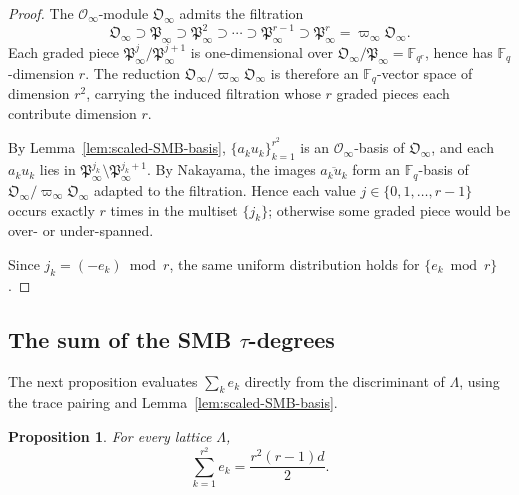 \documentclass[12pt]{amsart}
\newtheorem{prop}[thm]{Proposition}
\theoremstyle{definition}
\theoremstyle{remark}
\numberwithin{equation}{section}
\numberwithin{thm}{section}
\newcommand{\fO}{\mathfrak{O}}
\newcommand{\fP}{\mathfrak{P}}
\newcommand{\cO}{\mathcal{O}}
\newcommand{\F}{\mathbb{F}}
\newcommand{\La}{\Lambda}
\begin{document}
	\begin{proof}
		The $\cO_\infty$-module $\fO_\infty$ admits the filtration
		\[
		\fO_\infty \supset \fP_\infty \supset \fP_\infty^2 \supset \cdots \supset \fP_\infty^{r-1} \supset \fP_\infty^r = \varpi_\infty \fO_\infty.
		\]
		Each graded piece $\fP_\infty^j/\fP_\infty^{j+1}$ is one-dimensional over $\fO_\infty/\fP_\infty = \F_{q^r}$, hence has $\F_q$-dimension $r$. The reduction $\fO_\infty/\varpi_\infty \fO_\infty$ is therefore an $\F_q$-vector space of dimension $r^2$, carrying the induced filtration whose $r$ graded pieces each contribute dimension $r$.
		
		By Lemma~\ref{lem:scaled-SMB-basis}, $\{a_k u_k\}_{k=1}^{r^2}$ is an $\cO_\infty$-basis of $\fO_\infty$, and each $a_k u_k$ lies in $\fP_\infty^{j_k} \setminus \fP_\infty^{j_k+1}$. By Nakayama, the images $\overline{a_k u_k}$ form an $\F_q$-basis of $\fO_\infty/\varpi_\infty \fO_\infty$ adapted to the filtration. Hence each value $j \in \{0, 1, \ldots, r-1\}$ occurs exactly $r$ times in the multiset $\{j_k\}$; otherwise some graded piece would be over- or under-spanned.
		
		Since $j_k = (-e_k) \bmod r$, the same uniform distribution holds for $\{e_k \bmod r\}$.
	\end{proof}
	
	\subsection{The sum of the SMB \texorpdfstring{$\tau$}{tau}-degrees}\label{sub:sum-ek}
	
	The next proposition evaluates $\sum_k e_k$ directly from the discriminant of $\La$, using the trace pairing and Lemma~\ref{lem:scaled-SMB-basis}.
	
	\begin{prop}\label{prop:sum-ek}
		For every lattice $\La$,
		\[
		\sum_{k=1}^{r^2} e_k = \frac{r^2(r-1)d}{2}.
		\]
	\end{prop}
	
\end{document}
